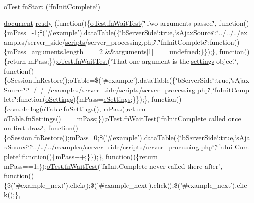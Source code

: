 \begin{DoxyCompactItemize}
\item 
\hyperlink{unit__test_8js_a3b2d259e2df3b6860d9047a92d09d0d6}{o\+Test} \hyperlink{4__server-side_2fn_init_complete_8js_a5aa6f98bcfc5d19778b8e5f706fa697c}{fn\+Start} (\char`\"{}fn\+Init\+Complete\char`\"{})
\item 
\hyperlink{outside_events_8js_aa14f8e0338cced6720590fd2ea13bd4b}{document} \hyperlink{4__server-side_2fn_init_complete_8js_a877cb7444c9c6531a6fe27fae821045f}{ready} (function()\{\hyperlink{onhold_24__server-side_2__zero__config_8js_ab25c4d596771c0133cdc45178ce72c3d}{o\+Test.\+fn\+Wait\+Test}(\char`\"{}Two arguments passed\char`\"{}, function()\{m\+Pass=-\/1;\$('\#example').data\+Table(\{\char`\"{}b\+Server\+Side\char`\"{}\+:true,\char`\"{}s\+Ajax\+Source\char`\"{}\+:\char`\"{}../../../examples/server\+\_\+side/\hyperlink{tinymce_8jquery_8dev_8js_a09066d4d580eeec222f858d588b4cdef}{scripts}/server\+\_\+processing.\+php\char`\"{},\char`\"{}fn\+Init\+Complete\char`\"{}\+:function()\{m\+Pass=arguments.\+length===2 \&\&arguments\mbox{[}1\mbox{]}===\hyperlink{tinymce_8js_a08113a236cc18d2a9d5ce27e638012be}{undefined};\}\});\}, function()\{return m\+Pass;\});\hyperlink{onhold_24__server-side_2__zero__config_8js_ab25c4d596771c0133cdc45178ce72c3d}{o\+Test.\+fn\+Wait\+Test}(\char`\"{}That one argument is the \hyperlink{jquery_8tooltip_8js_a52fb9116a07f71570fbf0bd12ff4c9f8}{settings} object\char`\"{}, function()\{o\+Session.\+fn\+Restore();o\+Table=\$('\#example').data\+Table(\{\char`\"{}b\+Server\+Side\char`\"{}\+:true,\char`\"{}s\+Ajax\+Source\char`\"{}\+:\char`\"{}../../../examples/server\+\_\+side/\hyperlink{tinymce_8jquery_8dev_8js_a09066d4d580eeec222f858d588b4cdef}{scripts}/server\+\_\+processing.\+php\char`\"{},\char`\"{}fn\+Init\+Complete\char`\"{}\+:function(\hyperlink{model_8settings_8js_a4857b9c813b4dea010668e9555d0aca7}{o\+Settings})\{m\+Pass=\hyperlink{model_8settings_8js_a4857b9c813b4dea010668e9555d0aca7}{o\+Settings};\}\});\}, function()\{\hyperlink{compat3x_2plugin_8js_ab3887f37384641bb0ba0db1942f91ee1}{console.\+log}(\hyperlink{api_8methods_8js_a78f387fab92a85c2cb7830bc5d8a6141}{o\+Table.\+fn\+Settings}(), m\+Pass);return \hyperlink{api_8methods_8js_a78f387fab92a85c2cb7830bc5d8a6141}{o\+Table.\+fn\+Settings}()===m\+Pass;\});\hyperlink{onhold_24__server-side_2__zero__config_8js_ab25c4d596771c0133cdc45178ce72c3d}{o\+Test.\+fn\+Wait\+Test}(\char`\"{}fn\+Init\+Complete called once \hyperlink{fullpage_2plugin_8min_8js_a1cfa98b7fed2aaf9fee3b68dbb7f9497}{on} first draw\char`\"{}, function()\{o\+Session.\+fn\+Restore();m\+Pass=0;\$('\#example').data\+Table(\{\char`\"{}b\+Server\+Side\char`\"{}\+:true,\char`\"{}s\+Ajax\+Source\char`\"{}\+:\char`\"{}../../../examples/server\+\_\+side/\hyperlink{tinymce_8jquery_8dev_8js_a09066d4d580eeec222f858d588b4cdef}{scripts}/server\+\_\+processing.\+php\char`\"{},\char`\"{}fn\+Init\+Complete\char`\"{}\+:function()\{m\+Pass++;\}\});\}, function()\{return m\+Pass==1;\});\hyperlink{onhold_24__server-side_2__zero__config_8js_ab25c4d596771c0133cdc45178ce72c3d}{o\+Test.\+fn\+Wait\+Test}(\char`\"{}fn\+Init\+Complete never called there after\char`\"{}, function()\{\$('\#example\+\_\+next').click();\$('\#example\+\_\+next').click();\$('\#example\+\_\+next').click();\}, 
\end{DoxyCompactItemize}
